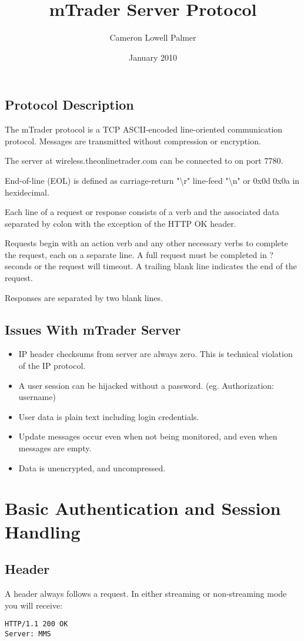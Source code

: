 \documentclass[12pt,twoside,letterpaper]{report}
\title{mTrader Server Protocol}
\author{Cameron Lowell Palmer}
\date{January 2010}
\begin{document}
\maketitle

\section*{Protocol Description}
The mTrader protocol is a TCP ASCII-encoded line-oriented communication protocol. Messages are transmitted without compression or encryption.

The server at wireless.theonlinetrader.com can be connected to on port 7780.

End-of-line (EOL) is defined as carriage-return "\textbackslash r" line-feed "\textbackslash n" or 0x0d 0x0a in hexidecimal.

Each line of a request or response consists of a verb and the associated data separated by colon with the exception of the HTTP OK header.

Requests begin with an action verb and any other necessary verbs to complete the request, each on a  separate line. A full request must be completed in ? seconds or the request will timeout. A trailing blank line indicates the end of the request.

Responses are separated by two blank lines. 

\section*{Issues With mTrader Server}
\begin{itemize}
\item IP header checksums from server are always zero. This is technical violation of the IP protocol.
\item A user session can be hijacked without a password. (eg. Authorization: username)
\item User data is plain text including login credentials.
\item Update messages occur even when not being monitored, and even when messages are empty.
\item Data is unencrypted, and uncompressed.
\end{itemize}

\chapter*{Basic Authentication and Session Handling}
\section*{Header}
A header always follows a request. In either streaming or non-streaming mode you will receive:
\begin{verbatim}
HTTP/1.1 200 OK
Server: MMS
\end{verbatim}
\end{document}
